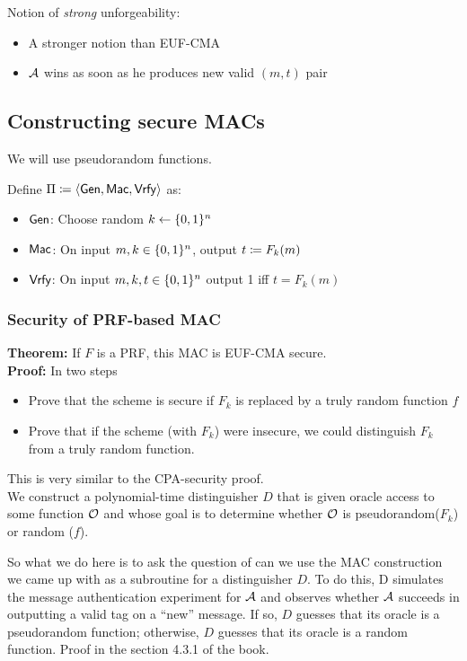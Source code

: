 \documentclass[12pt]{article}
\begin{document}
Notion of \emph{strong} unforgeability:
\begin{itemize}
\item A stronger notion than EUF-CMA
\item $\mathcal{A}$ wins as soon as he produces new valid $(m,t)$ pair
\end{itemize}

\subsection{Constructing secure MACs}
We will use pseudorandom functions.

Define $\Pi \coloneqq \langle \operatorname{\mathsf{Gen}}, \operatorname{\mathsf{Mac}}, \operatorname{\mathsf{Vrfy}} \rangle$ as:
\begin{itemize}
\item $\operatorname{\mathsf{Gen}}$: Choose random $k\leftarrow \{0,1\}^n$
\item $\operatorname{\mathsf{Mac}}$: On input $m,k \in \{0,1\}^n$, output $t \coloneqq F_k(m)$
\item $\operatorname{\mathsf{Vrfy}}$: On input  $m,k,t \in \{0,1\}^n$ output 1 iff $t = F_k(m)$
\end{itemize}
\newpage
\subsubsection{Security of PRF-based MAC}
\textbf{Theorem:} If $F$ is a PRF, this MAC is EUF-CMA secure.\\
\textbf{Proof:} In two steps
\begin{itemize}
\item Prove that the scheme is secure if $F_k$ is replaced by a truly random function $f$
\item Prove that if the scheme (with $F_k$) were insecure, we could distinguish $F_k$ from a truly random function.
\end{itemize}
 This is very similar to the CPA-security proof.\\
 We construct a polynomial-time distinguisher $D$ that is given oracle access to some function $\mathcal{O}$ and whose goal is to determine whether $\mathcal{O}$ is pseudorandom($F_k$) or random ($f$).
 
 So what we do here is to ask the question of can we use the MAC construction we came up with as a subroutine for a distinguisher $D$. To do this, D simulates the message authentication experiment for $\mathcal{A}$ and observes whether $\mathcal{A}$ succeeds in outputting a valid tag on a “new” message. If so, $D$ guesses that its oracle is a pseudorandom function; otherwise, $D$ guesses that its oracle is a random function.
Proof in the section 4.3.1 of the book.
\end{document}
